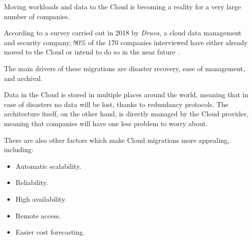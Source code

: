 
Moving workloads and data to the Cloud is becoming a reality for a very large number of companies.

According to a survey carried out in 2018 by \textit{Druva}, a cloud data management and security company, 90\% of the 170 companies interviewed have either already moved to the Cloud or intend to do so in the near future \cite{bib:related_work:migration:moving_to_cloud}.

The main drivers of these migrations are disaster recovery, ease of management, and archival.

Data in the Cloud is stored in multiple places around the world, meaning that in case of disasters no data will be lost, thanks to redundancy protocols.
The architecture itself, on the other hand, is directly managed by the Cloud provider, meaning that companies will have one less problem to worry about.

There are also other factors which make Cloud migrations more appealing, including:
\begin{itemize}
    \item Automatic scalability.
    \item Reliability.
    \item High availability.
    \item Remote access.
    \item Easier cost forecasting.
\end{itemize}
